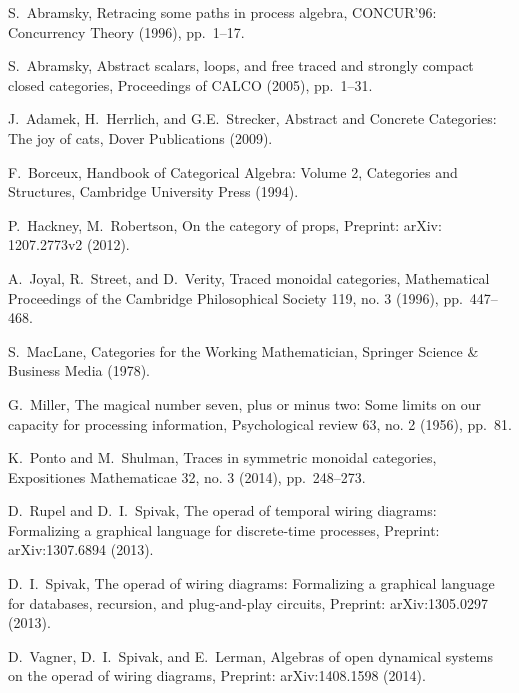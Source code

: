 \documentclass[12pt,oneside,article,draft]{memoir}
\begin{document}
\begin{thebibliography}{XXX}
 S.~Abramsky, Retracing some paths in process algebra, CONCUR'96: Concurrency Theory (1996), pp.~1--17.

 S.~Abramsky, Abstract scalars, loops, and free traced and strongly compact closed categories, Proceedings of CALCO (2005), pp.~1--31.

 J.~Adamek, H.~Herrlich, and G.E.~Strecker, Abstract and Concrete Categories: The joy of cats, Dover Publications (2009).

 F.~Borceux, Handbook of Categorical Algebra: Volume 2, Categories and Structures, Cambridge University Press (1994).

 P.~Hackney, M.~Robertson, On the category of props, Preprint: arXiv: 1207.2773v2 (2012).

 A.~Joyal, R.~Street, and D.~Verity, Traced monoidal categories, Mathematical Proceedings of the Cambridge Philosophical Society 119, no. 3 (1996), pp.~447--468.

 S.~MacLane, Categories for the Working Mathematician, Springer Science \& Business Media (1978).

 G.~Miller, The magical number seven, plus or minus two: Some limits on our capacity for processing information, Psychological review 63, no. 2 (1956), pp.~81.

 K.~Ponto and M.~Shulman, Traces in symmetric monoidal categories, Expositiones Mathematicae 32, no. 3 (2014), pp.~248--273.

 D.~Rupel and D.~I.~Spivak, The operad of temporal wiring diagrams: Formalizing a graphical language for discrete-time processes, Preprint: arXiv:1307.6894 (2013).

 D.~I.~Spivak, The operad of wiring diagrams: Formalizing a graphical language for databases, recursion, and plug-and-play circuits, Preprint: arXiv:1305.0297 (2013).

 D.~Vagner, D.~I.~Spivak, and E.~Lerman, Algebras of open dynamical systems on the operad of wiring diagrams, Preprint: arXiv:1408.1598 (2014).

\end{thebibliography}
\end{document}
